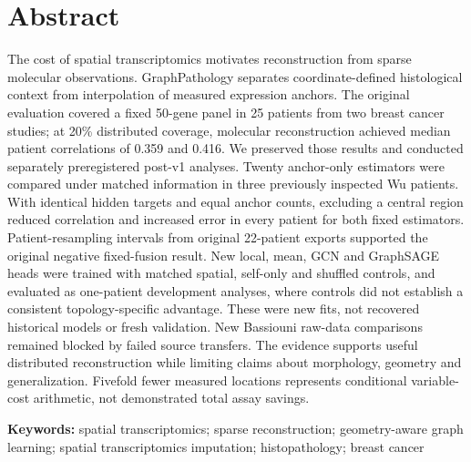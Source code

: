 
\begin{center}
{\Large\bfseries \PaperTitle\par}
\vspace{12pt}
\AuthorNames\par
\vspace{5pt}
\AuthorAffiliations\par
\vspace{5pt}
\Correspondence\par
\end{center}
\vspace{8pt}
\section*{Abstract}
The cost of spatial transcriptomics motivates reconstruction from sparse molecular observations. GraphPathology separates coordinate-defined histological context from interpolation of measured expression anchors. The original evaluation covered a fixed 50-gene panel in 25 patients from two breast cancer studies; at 20\% distributed coverage, molecular reconstruction achieved median patient correlations of 0.359 and 0.416. We preserved those results and conducted separately preregistered post-v1 analyses. Twenty anchor-only estimators were compared under matched information in three previously inspected Wu patients. With identical hidden targets and equal anchor counts, excluding a central region reduced correlation and increased error in every patient for both fixed estimators. Patient-resampling intervals from original 22-patient exports supported the original negative fixed-fusion result. New local, mean, GCN and GraphSAGE heads were trained with matched spatial, self-only and shuffled controls, and evaluated as one-patient development analyses, where controls did not establish a consistent topology-specific advantage. These were new fits, not recovered historical models or fresh validation. New Bassiouni raw-data comparisons remained blocked by failed source transfers. The evidence supports useful distributed reconstruction while limiting claims about morphology, geometry and generalization. Fivefold fewer measured locations represents conditional variable-cost arithmetic, not demonstrated total assay savings.

\noindent\textbf{Keywords:} spatial transcriptomics; sparse reconstruction; geometry-aware graph learning; spatial transcriptomics imputation; histopathology; breast cancer

\linenumbers
